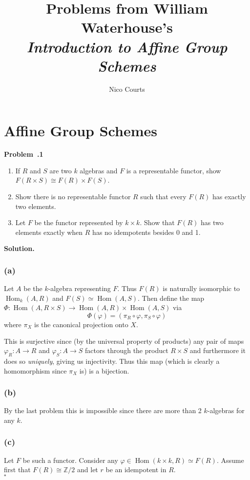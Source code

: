 \documentclass[12pt]{article}
\newcommand*{\Z}{
\mathbb{Z}
}
\DeclareMathOperator{\Hom}{Hom}
\newenvironment{prob}[1]{\par\smallskip
	\noindent\begin{mdframed}\small \textbf{Problem~\thesection.#1} \rmfamily\quad}{\end{mdframed}\medskip}
\newenvironment{sol}{\noindent \textbf{Solution.} \,}{\\\hspace*{\fill}$\square$\medskip}
\begin{document}
\title{ Problems from William Waterhouse's\\ \textit{Introduction to Affine Group Schemes}\vspace{-1ex}}
\author{Nico Courts}
\date{}
\maketitle


\section{Affine Group Schemes}
\begin{prob}{1}
	\begin{enumerate}
		\item If $R$ and $S$ are two $k$ algebras and $F$ is a representable functor, show $F(R\times S)\cong F(R)\times F(S)$.
		\item Show there is no representable functor $R$ such that every $F(R)$ has exactly two elements.
		\item Let $F$ be the functor represented by $k\times k$. Show that $F(R)$ has two elements exactly when $R$ has no idempotents besides 0 and 1.
	\end{enumerate}
\end{prob}

\begin{sol}
	\subsubsection*{(a)}
	Let $A$ be the $k$-algebra representing $F$. Thus $F(R)$ is naturally isomorphic to
	$\Hom_k(A,R)$ and $F(S)\simeq\Hom(A,S)$. Then define the map $\Phi:\Hom(A,R\times S)\to\Hom(A,R)\times\Hom(A,S)$
	via
	\[\Phi(\varphi)=(\pi_R\circ\varphi,\pi_S\circ\varphi)\]
	where $\pi_X$ is the canonical projection onto $X$.

	This is surjective since (by the universal property of products) any pair of maps
	$\varphi_R:A\to R$ and $\varphi_S:A\to S$ factors through the product $R\times S$
	and furthermore it does so \textit{uniquely}, giving us injectivity. Thus this map
	(which is clearly a homomorphism since $\pi_X$ is) is a bijection.
	\subsubsection*{(b)}
	By the last problem this is impossible since there are more than 2 $k$-algebras for any $k$.
	\subsubsection*{(c)}
	Let $F$ be such a functor. Consider any $\varphi\in\Hom(k\times k, R)\simeq F(R)$.
	Assume first that $F(R)\cong \Z/2$ and let $r$ be an idempotent in $R$. 
\end{sol}
\end{document}

